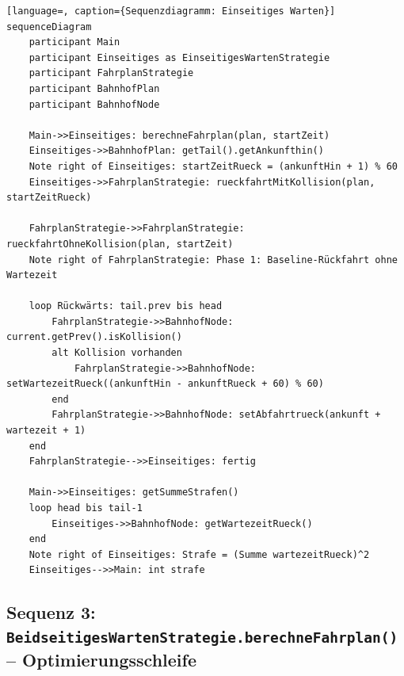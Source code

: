 \documentclass[12pt,a4paper]{article}
\begin{document}
\begin{lstlisting}[language=, caption={Sequenzdiagramm: Einseitiges Warten}]
sequenceDiagram
    participant Main
    participant Einseitiges as EinseitigesWartenStrategie
    participant FahrplanStrategie
    participant BahnhofPlan
    participant BahnhofNode

    Main->>Einseitiges: berechneFahrplan(plan, startZeit)
    Einseitiges->>BahnhofPlan: getTail().getAnkunfthin()
    Note right of Einseitiges: startZeitRueck = (ankunftHin + 1) % 60
    Einseitiges->>FahrplanStrategie: rueckfahrtMitKollision(plan, startZeitRueck)

    FahrplanStrategie->>FahrplanStrategie: rueckfahrtOhneKollision(plan, startZeit)
    Note right of FahrplanStrategie: Phase 1: Baseline-Rückfahrt ohne Wartezeit

    loop Rückwärts: tail.prev bis head
        FahrplanStrategie->>BahnhofNode: current.getPrev().isKollision()
        alt Kollision vorhanden
            FahrplanStrategie->>BahnhofNode: setWartezeitRueck((ankunftHin - ankunftRueck + 60) % 60)
        end
        FahrplanStrategie->>BahnhofNode: setAbfahrtrueck(ankunft + wartezeit + 1)
    end
    FahrplanStrategie-->>Einseitiges: fertig

    Main->>Einseitiges: getSummeStrafen()
    loop head bis tail-1
        Einseitiges->>BahnhofNode: getWartezeitRueck()
    end
    Note right of Einseitiges: Strafe = (Summe wartezeitRueck)^2
    Einseitiges-->>Main: int strafe
\end{lstlisting}

\subsection{Sequenz 3: \texttt{BeidseitigesWartenStrategie.berechneFahrplan()} -- Optimierungsschleife}
\end{document}
